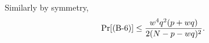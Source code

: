 Similarly by symmetry,
%
\begin{align*}
\Pr[\text{(B-6)}] 
\leq
\frac{w^4q^2(p+wq)}{2(N-p-wq)^2}.
\end{align*}
%
%
%


%
%
%
%
%
%
%

